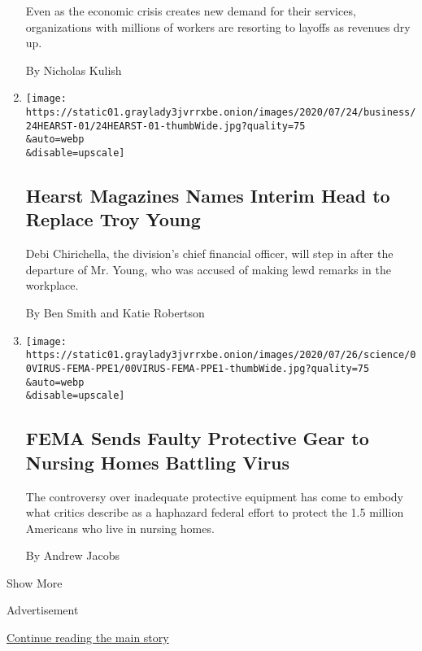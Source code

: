 \begin{enumerate}
  Even as the economic crisis creates new demand for their services,
  organizations with millions of workers are resorting to layoffs as
  revenues dry up.

  By Nicholas Kulish
\item
  \href{/2020/07/24/business/media/hearst-troy-young-replacement-president.html}{}

  \texttt{[image: https://static01.graylady3jvrrxbe.onion/images/2020/07/24/business/24HEARST-01/24HEARST-01-thumbWide.jpg?quality=75\\\&auto=webp\\\&disable=upscale]}

  \hypertarget{hearst-magazines-names-interim-head-to-replace-troy-young}{%
  \subsection{Hearst Magazines Names Interim Head to Replace Troy
  Young}\label{hearst-magazines-names-interim-head-to-replace-troy-young}}

  Debi Chirichella, the division's chief financial officer, will step in
  after the departure of Mr. Young, who was accused of making lewd
  remarks in the workplace.

  By Ben Smith and Katie Robertson
\item
  \href{/2020/07/24/health/coronavirus-nursing-homes-PPE.html}{}

  \texttt{[image: https://static01.graylady3jvrrxbe.onion/images/2020/07/26/science/00VIRUS-FEMA-PPE1/00VIRUS-FEMA-PPE1-thumbWide.jpg?quality=75\\\&auto=webp\\\&disable=upscale]}

  \hypertarget{fema-sends-faulty-protective-gear-to-nursing-homes-battling-virus}{%
  \subsection{FEMA Sends Faulty Protective Gear to Nursing Homes
  Battling
  Virus}\label{fema-sends-faulty-protective-gear-to-nursing-homes-battling-virus}}

  The controversy over inadequate protective equipment has come to
  embody what critics describe as a haphazard federal effort to protect
  the 1.5 million Americans who live in nursing homes.

  By Andrew Jacobs
\end{enumerate}

Show More

Advertisement

\protect\hyperlink{after-mid2}{Continue reading the main story}


